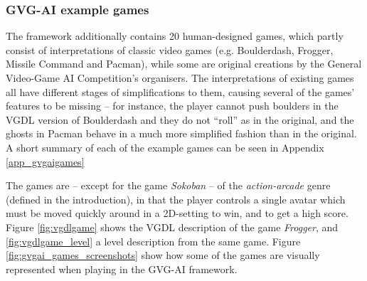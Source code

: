 \documentclass[a4paper,titlepage,final]{report}
\begin{document}
\subsubsection*{GVG-AI example games}
The framework additionally contains 20 human-designed games, which partly consist of interpretations of classic video games (e.g. Boulderdash, Frogger, Missile Command and Pacman), while some are original creations by the General Video-Game AI Competition's organisers. 
The interpretations of existing games all have different stages of simplifications to them, causing several of the games' features to be missing -- for instance, the player cannot push boulders in the VGDL version of Boulderdash and they do not ``roll'' as in the original, and the ghosts in Pacman behave in a much more simplified fashion than in the original.
A short summary of each of the example games can be seen in Appendix \ref{app_gvgaigames}

The games are -- except for the game \emph{Sokoban} -- of the \textit{action-arcade} genre (defined in the introduction), in that the player controls a single avatar which must be moved quickly around in a 2D-setting to win, and to get a high score.
Figure \ref{fig:vgdlgame} shows the VGDL description of the game \emph{Frogger}, and \ref{fig:vgdlgame_level} a level description from the same game.
Figure \ref{fig:gvgai_games_screenshots} show how some of the games are visually represented when playing in the GVG-AI framework.
\end{document}
